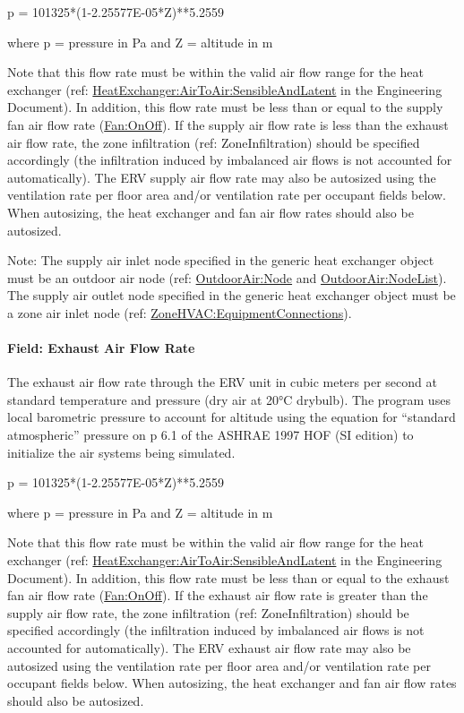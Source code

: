 p = 101325*(1-2.25577E-05*Z)**5.2559

where p = pressure in Pa and Z = altitude in m

Note that this flow rate must be within the valid air flow range for the heat exchanger (ref: \hyperref[heatexchangerairtoairsensibleandlatent]{HeatExchanger:AirToAir:SensibleAndLatent} in the Engineering Document). In addition, this flow rate must be less than or equal to the supply fan air flow rate (\hyperref[fanonoff]{Fan:OnOff}). If the supply air flow rate is less than the exhaust air flow rate, the zone infiltration (ref: ZoneInfiltration) should be specified accordingly (the infiltration induced by imbalanced air flows is not accounted for automatically). The ERV supply air flow rate may also be autosized using the ventilation rate per floor area and/or ventilation rate per occupant fields below. When autosizing, the heat exchanger and fan air flow rates should also be autosized.

Note: The supply air inlet node specified in the generic heat exchanger object must be an outdoor air node (ref: \hyperref[outdoorairnode]{OutdoorAir:Node} and \hyperref[outdoorairnodelist]{OutdoorAir:NodeList}). The supply air outlet node specified in the generic heat exchanger object must be a zone air inlet node (ref: \hyperref[zonehvacequipmentconnections]{ZoneHVAC:EquipmentConnections}).

\paragraph{Field: Exhaust Air Flow Rate}\label{field-exhaust-air-flow-rate-1}

The exhaust air flow rate through the ERV unit in cubic meters per second at standard temperature and pressure (dry air at 20\si{\degreeCelsius} drybulb). The program uses local barometric pressure to account for altitude using the equation for ``standard atmospheric'' pressure on p 6.1 of the ASHRAE 1997 HOF (SI edition) to initialize the air systems being simulated.

p = 101325*(1-2.25577E-05*Z)**5.2559

where p = pressure in Pa and Z = altitude in m

Note that this flow rate must be within the valid air flow range for the heat exchanger (ref: \hyperref[heatexchangerairtoairsensibleandlatent]{HeatExchanger:AirToAir:SensibleAndLatent} in the Engineering Document). In addition, this flow rate must be less than or equal to the exhaust fan air flow rate (\hyperref[fanonoff]{Fan:OnOff}). If the exhaust air flow rate is greater than the supply air flow rate, the zone infiltration (ref: ZoneInfiltration) should be specified accordingly (the infiltration induced by imbalanced air flows is not accounted for automatically). The ERV exhaust air flow rate may also be autosized using the ventilation rate per floor area and/or ventilation rate per occupant fields below. When autosizing, the heat exchanger and fan air flow rates should also be autosized.

